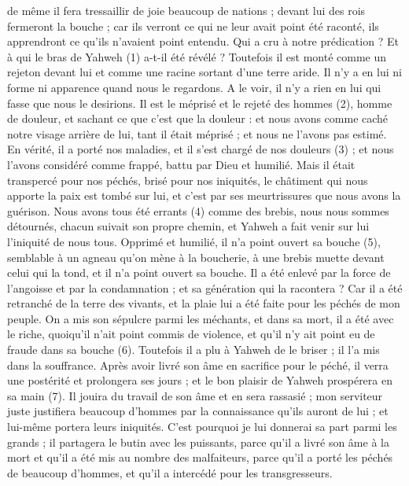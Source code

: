 \begin{multicols}{2}
de même il fera tressaillir de joie beaucoup de nations ; devant lui des rois fermeront la bouche ; car ils verront ce qui ne leur avait point été raconté, ils apprendront ce qu’ils n’avaient point entendu.
\VerseOne{}Qui a cru à notre prédication ? Et à qui le bras de Yahweh (1) a-t-il été révélé ?
Toutefois il est monté comme un rejeton devant lui et comme une racine sortant d'une terre aride. Il n’y a en lui ni forme ni apparence quand nous le regardons. A le voir, il n'y a rien en lui qui fasse que nous le desirions.
Il est le méprisé et le rejeté des hommes (2), homme de douleur, et sachant ce que c'est que la douleur : et nous avons comme caché notre visage arrière de lui, tant il était méprisé ; et nous ne l'avons pas estimé.
En vérité, il a porté nos maladies, et il s’est chargé de nos douleurs (3) ; et nous l’avons considéré comme frappé, battu par Dieu et humilié.
Mais il était transpercé pour nos péchés, brisé pour nos iniquités, le châtiment qui nous apporte la paix est tombé sur lui, et c’est par ses meurtrissures que nous avons la guérison.
Nous avons tous été errants (4) comme des brebis, nous nous sommes détournés, chacun suivait son propre chemin, et Yahweh a fait venir sur lui l'iniquité de nous tous.
Opprimé et humilié, il n'a point ouvert sa bouche (5), semblable à un agneau qu’on mène à la boucherie, à une brebis muette devant celui qui la tond, et il n'a point ouvert sa bouche.
Il a été enlevé par la force de l'angoisse et par la condamnation ; et sa génération qui la racontera ? Car il a été retranché de la terre des vivants, et la plaie lui a été faite pour les péchés de mon peuple.
On a mis son sépulcre parmi les méchants, et dans sa mort, il a été avec le riche, quoiqu’il n’ait point commis de violence, et qu’il n’y ait point eu de fraude dans sa bouche (6).
Toutefois il a plu à Yahweh de le briser ; il l'a mis dans la souffrance. Après avoir livré son âme en sacrifice pour le péché, il verra une postérité et prolongera ses jours ; et le bon plaisir de Yahweh prospérera en sa main (7).
Il jouira du travail de son âme et en sera rassasié ; mon serviteur juste justifiera beaucoup d’hommes par la connaissance qu'ils auront de lui ; et lui-même portera leurs iniquités.
C'est pourquoi je lui donnerai sa part parmi les grands ; il partagera le butin avec les puissants, parce qu'il a livré son âme à la mort et qu’il a été mis au nombre des malfaiteurs, parce qu’il a porté les péchés de beaucoup d’hommes, et qu’il a intercédé pour les transgresseurs.

\end{multicols}
